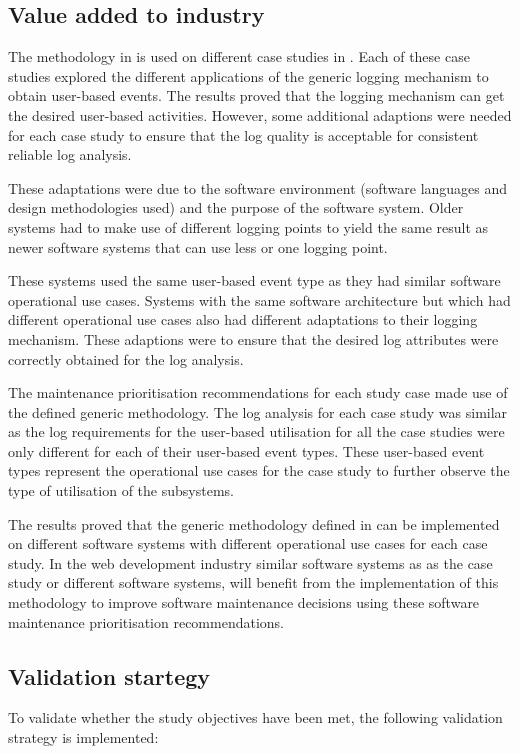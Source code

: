 \subsection{Value added to industry}
The methodology in  is used on different case studies in . Each of these case studies explored the different applications of the generic logging mechanism to obtain user-based events. The results proved that the logging mechanism can get the desired user-based activities. However, some additional adaptions were needed for each case study to ensure that the log quality is acceptable for consistent reliable log analysis.\par These adaptations were due to the software environment (software languages and design methodologies used) and the purpose of the software system. Older systems had to make use of different logging points to yield the same result as newer software systems that can use less or one logging point.\par These systems used the same user-based event type as they had similar software operational use cases. Systems with the same software architecture but which had different operational use cases also had different adaptations to their logging mechanism. These adaptions were to ensure that the desired log attributes were correctly obtained for the log analysis. \par The maintenance prioritisation recommendations for each study case made use of the defined generic methodology. The log analysis for each case study was similar as the log requirements for the user-based utilisation for all the case studies were only different for each of their user-based event types. These user-based event types represent the operational use cases for the case study to further observe the type of utilisation of the subsystems. \par The results proved that the generic methodology defined in  can be implemented on different software systems with different operational use cases for each case study. In the web development industry similar software systems as as the case study or different software systems, will benefit from the implementation of this methodology to improve software maintenance decisions using these software maintenance prioritisation recommendations.

\subsection{Validation startegy}
To validate whether the study objectives have been met, the following validation strategy is implemented:

